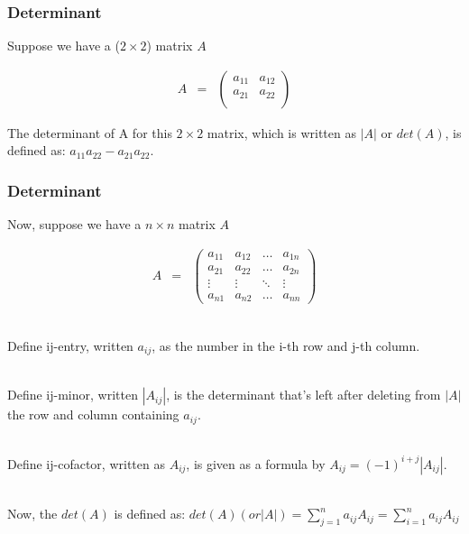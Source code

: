 \documentclass{beamer}
\numberwithin{equation}{section}
\begin{document}
\begin{frame}
\frametitle{Determinant}

Suppose we have a ($2 \times 2$) matrix $A$

\begin{eqnarray}
A & = & \begin{pmatrix}
a_{11} & a_{12} \\
a_{21} & a_{22} \\
\end{pmatrix} \nonumber
\end{eqnarray} \pause

The determinant of A for this $2 \times 2$ matrix, which is written as $|A|$ or $det(A)$, is defined as: $a_{11} a_{22} - a_{21} a_{22}$.
\end{frame}



\begin{frame}
\frametitle{Determinant}

Now, suppose we have a $n \times n$ matrix $A$

\begin{eqnarray}
A & = & \begin{pmatrix}
a_{11} & a_{12} & \hdots & a_{1n} \\
a_{21} & a_{22} & \hdots & a_{2n} \\
\vdots & \vdots & \ddots & \vdots \\
a_{n1} & a_{n2} & \hdots & a_{nn}
\end{pmatrix} \nonumber
\end{eqnarray} \pause

\ \\Define ij-entry, written $a_{ij}$, as the number in the i-th row and j-th column. \pause

\ \\Define ij-minor, written $|A_{ij}|$, is the determinant that's left after deleting from $|A|$ the row and column containing $a_{ij}$. \pause

\ \\Define ij-cofactor, written as $A_{ij}$, is given as a formula by $A_{ij} = (-1)^{i+j} |A_{ij}|$. \pause

\ \\Now, the $det(A)$ is defined as: $det(A) (or |A|) = \sum_{j = 1}^{n} a_{ij}A_{ij} = \sum_{i = 1}^{n} a_{ij}A_{ij}$
\end{frame}
\end{document}

